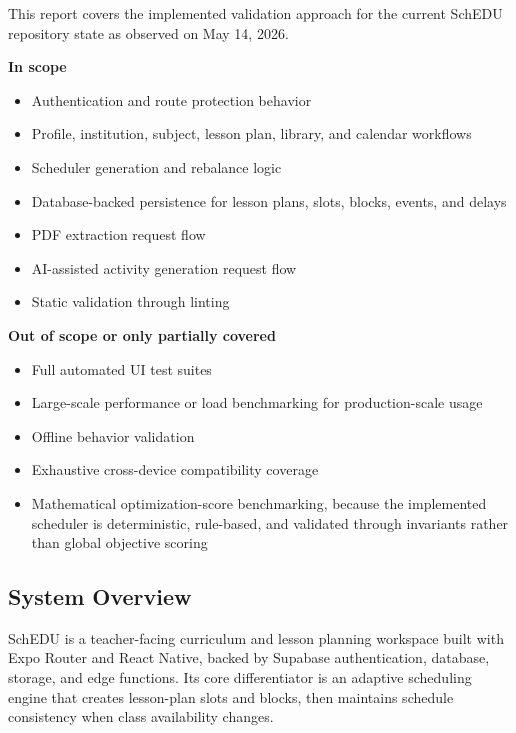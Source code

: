 \documentclass[12pt]{article}
\begin{document}
This report covers the implemented validation approach for the current SchEDU repository state as observed on May 14, 2026.

\textbf{In scope}
\begin{itemize}
    \item Authentication and route protection behavior
    \item Profile, institution, subject, lesson plan, library, and calendar workflows
    \item Scheduler generation and rebalance logic
    \item Database-backed persistence for lesson plans, slots, blocks, events, and delays
    \item PDF extraction request flow
    \item AI-assisted activity generation request flow
    \item Static validation through linting
\end{itemize}

\textbf{Out of scope or only partially covered}
\begin{itemize}
    \item Full automated UI test suites
    \item Large-scale performance or load benchmarking for production-scale usage
    \item Offline behavior validation
    \item Exhaustive cross-device compatibility coverage
    \item Mathematical optimization-score benchmarking, because the implemented scheduler is deterministic, rule-based, and validated through invariants rather than global objective scoring
\end{itemize}

\subsection{System Overview}

SchEDU is a teacher-facing curriculum and lesson planning workspace built with Expo Router and React Native, backed by Supabase authentication, database, storage, and edge functions. Its core differentiator is an adaptive scheduling engine that creates lesson-plan slots and blocks, then maintains schedule consistency when class availability changes.
\end{document}
